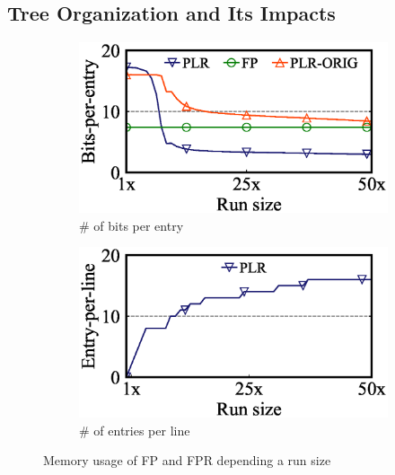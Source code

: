 \subsection{Tree Organization and Its Impacts}
\label{sec:design:tree}
\begin{figure}[t]
\centering
     \begin{subfigure}[b]{0.21\textwidth}
         \centering
         \includegraphics[width=\textwidth]{figs/OSDI/exp_data/bit-per-entry/OURS-BF-PLR.eps}
         \vspace{-10pt}
         \caption{\# of bits per entry}
     \end{subfigure}
     \hfill
     \begin{subfigure}[b]{0.21\textwidth}
         \centering
         \includegraphics[width=\textwidth]{figs/OSDI/exp_data/line-per-entry/PLR-Range.eps}
         \vspace{-10pt}
         \caption{\# of entries per line}
     \end{subfigure}
       \vspace{-10pt}
     \caption{Memory usage of FP and FPR depending a run size}

     \label{fig:bf-plr-bit}
\end{figure}




